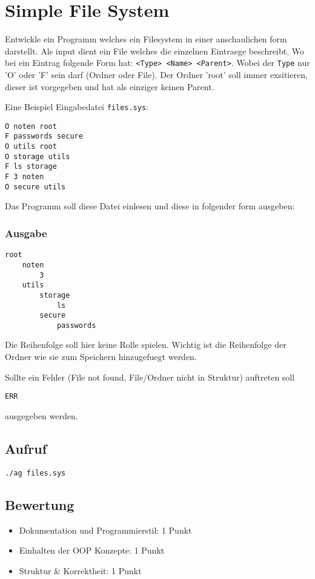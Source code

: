 \documentclass[a4paper,10pt]{article}
\begin{document}
\section*{Simple File System}

Entwickle ein Programm welches ein Filesystem in einer anschaulichen form darstellt. Als input dient ein File welches die einzelnen Eintraege beschreibt. Wo bei ein Eintrag folgende Form hat:
\texttt{<Type> <Name> <Parent>}. Wobei der \texttt{Type} nur 'O' oder 'F' sein darf (Ordner oder File). Der Ordner 'root' soll immer exsitieren, dieser ist vorgegeben und hat als einziger keinen Parent. 

Eine Beispiel Eingabedatei \texttt{files.sys}:
\begin{lstlisting}[frame=single]
O noten root
F passwords secure
O utils root
O storage utils
F ls storage
F 3 noten
O secure utils
\end{lstlisting}

Das Programm soll diese Datei einlesen und diese in folgender form ausgeben:
\subsubsection*{Ausgabe}
\begin{verbatim}
root
    noten
        3
    utils
        storage
            ls
        secure
            passwords
\end{verbatim}

Die Reihenfolge soll hier keine Rolle spielen. Wichtig ist die Reihenfolge der Ordner wie sie zum Speichern hinzugefuegt werden.

Sollte ein Fehler (File not found, File/Ordner nicht in Struktur) auftreten soll
\begin{verbatim}
ERR
\end{verbatim}
ausgegeben werden.

\subsection*{Aufruf}
\texttt{./ag files.sys}

\subsection*{Bewertung}
\begin{itemize}
 \item Dokumentation und Programmierstil: 1 Punkt
 \item Einhalten der OOP Konzepte: 1 Punkt
 \item Struktur \& Korrektheit: 1 Punkt
\end{itemize}

\newpage
\end{document}
